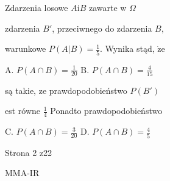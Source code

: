 \documentclass[a4paper,12pt]{article}
\begin{document}
Zdarzenia losowe $A \mathrm{i} B$ zawarte w $\Omega$

zdarzenia $B'$, przeciwnego do zdarzenia $B,$

warunkowe $P(A|B)=\displaystyle \frac{1}{5}$. Wynika stąd, $\dot{\mathrm{z}}\mathrm{e}$

A. $P(A\displaystyle \cap B)=\frac{1}{20}$ B. $P(A\displaystyle \cap B)=\frac{4}{15}$

są takie, ze prawdopodobieństwo $P(B')$

est równe $\displaystyle \frac{1}{4}$ Ponadto prawdopodobieństwo

C. $P(A\displaystyle \cap B)=\frac{3}{20}$ D. $P(A\displaystyle \cap B)=\frac{4}{5}$

Strona 2 z22

MMA-IR
\end{document}
